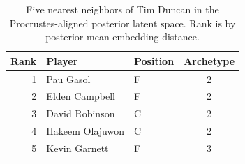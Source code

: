 \begin{table}[htbp]
  \centering\small
  \begin{tabular}{rllc}
    \toprule
    Rank & Player & Position & Archetype \\
    \midrule
    1 & Pau Gasol & F & 2 \\
    2 & Elden Campbell & F & 2 \\
    3 & David Robinson & C & 2 \\
    4 & Hakeem Olajuwon & C & 2 \\
    5 & Kevin Garnett & F & 3 \\
    \bottomrule
  \end{tabular}
  \caption{Five nearest neighbors of Tim Duncan in the Procrustes-aligned posterior latent space. Rank is by posterior mean embedding distance.}
  \label{tab:Tim_Duncan_neighbors}
\end{table}

